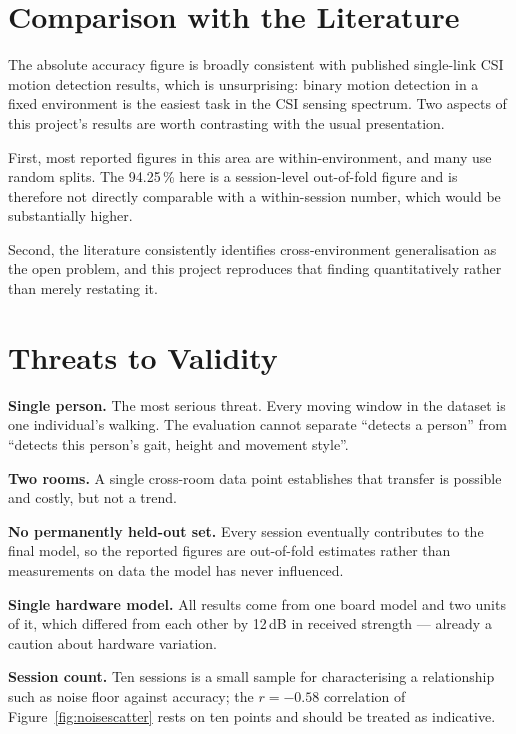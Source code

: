 \documentclass[11pt,a4paper,oneside]{report}
\begin{document}
\section{Comparison with the Literature}

The absolute accuracy figure is broadly consistent with published
single-link CSI motion detection results, which is unsurprising: binary motion
detection in a fixed environment is the easiest task in the CSI sensing
spectrum. Two aspects of this project's results are worth contrasting with the
usual presentation.

First, most reported figures in this area are within-environment, and many use
random splits. The 94.25\,\% here is a session-level out-of-fold figure and is
therefore not directly comparable with a within-session number, which would be
substantially higher.

Second, the literature consistently identifies cross-environment generalisation
as the open problem, and this project reproduces that finding quantitatively
rather than merely restating it.

\section{Threats to Validity}

\textbf{Single person.} The most serious threat. Every moving window in the
dataset is one individual's walking. The evaluation cannot separate ``detects a
person'' from ``detects this person's gait, height and movement style''.

\textbf{Two rooms.} A single cross-room data point establishes that transfer is
possible and costly, but not a trend.

\textbf{No permanently held-out set.} Every session eventually contributes to
the final model, so the reported figures are out-of-fold estimates rather than
measurements on data the model has never influenced.

\textbf{Single hardware model.} All results come from one board model and two
units of it, which differed from each other by 12\,dB in received strength ---
already a caution about hardware variation.

\textbf{Session count.} Ten sessions is a small sample for characterising a
relationship such as noise floor against accuracy; the $r = -0.58$ correlation
of Figure~\ref{fig:noisescatter} rests on ten points and should be treated as
indicative.

\end{document}
